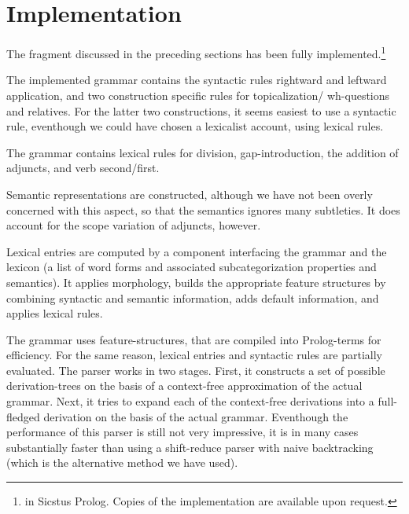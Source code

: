 
%
 
\section{Implementation}

The fragment discussed in the preceding sections has been fully implemented.\footnote{ in Sicstus Prolog.  Copies of the implementation are available upon request.}

The implemented grammar contains the syntactic rules rightward and leftward
application, and two construction specific rules for topicalization/{\sc
wh}-questions and relatives.  For the latter two constructions, it seems easiest to
use a syntactic rule, eventhough we could have chosen a lexicalist account, using
lexical rules.

The grammar contains lexical rules for division, gap-introduction, the addition 
of adjuncts, and verb second/first. 

Semantic representations are constructed, although we have not been overly 
concerned with this aspect, so that the semantics ignores many subtleties. It 
does account for the scope variation of adjuncts, however.

Lexical entries are computed by a component interfacing the grammar and the lexicon (a list of word forms and associated subcategorization properties and semantics). It applies morphology, builds the appropriate feature structures by combining syntactic and semantic information, adds default information, and applies lexical rules.

The grammar uses feature-structures, that are compiled into Prolog-terms for 
efficiency. For the same reason, lexical entries and syntactic rules are 
partially evaluated. The parser works in two stages. First, it constructs a set 
of possible derivation-trees on the basis of a context-free approximation of the 
actual grammar. Next, it tries to expand each of the context-free derivations 
into a full-fledged derivation on the basis of the actual grammar. Eventhough 
the performance of this parser is still not very impressive, it is in many cases 
substantially faster than using a shift-reduce parser with naive backtracking 
(which is the alternative method we have used). 

